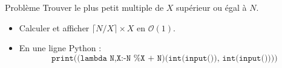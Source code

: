 \begin{frame}
    \frametitle{\problemtitle}
    \begin{block}{Problème}
        Trouver le plus petit multiple de $X$ supérieur ou égal à $N$.
    \end{block}
    \pause
    \begin{itemize}[<+->]
        \item Calculer et afficher $\lceil N/X \rceil \times X$ en $\mathcal{O}(1)$.
        \item En une ligne Python :
        \[
        \texttt{print((lambda N,X:-N \% X + N)(int(input()), int(input())))}
        \]
    \end{itemize}
    \solvestats
\end{frame}